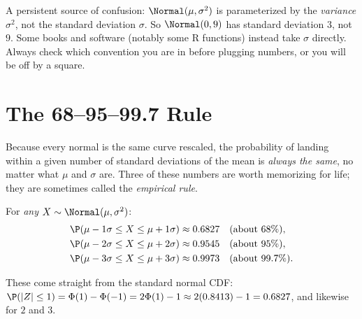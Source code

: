 \begin{trapbox}
A persistent source of confusion: $\Normal(\mu,\sigma^2)$ is parameterized by the
\emph{variance} $\sigma^2$, not the standard deviation $\sigma$. So $\Normal(0,9)$
has standard deviation $3$, not $9$. Some books and software (notably some R
functions) instead take $\sigma$ directly. Always check which convention you are
in before plugging numbers, or you will be off by a square.
\end{trapbox}

\section{The 68--95--99.7 Rule}
\label{ch12:empirical}

Because every normal is the same curve rescaled, the probability of landing within
a given number of standard deviations of the mean is \emph{always the same}, no
matter what $\mu$ and $\sigma$ are. Three of these numbers are worth memorizing
for life; they are sometimes called the \emph{empirical rule}.

\begin{focusbox}
For \emph{any} $X \sim \Normal(\mu, \sigma^2)$:
\begin{align*}
  \P(\mu - 1\sigma \le X \le \mu + 1\sigma) &\approx 0.6827 \quad (\text{about } 68\%),\\
  \P(\mu - 2\sigma \le X \le \mu + 2\sigma) &\approx 0.9545 \quad (\text{about } 95\%),\\
  \P(\mu - 3\sigma \le X \le \mu + 3\sigma) &\approx 0.9973 \quad (\text{about } 99.7\%).
\end{align*}
\end{focusbox}

These come straight from the standard normal CDF:
$\P(|Z| \le 1) = \Phi(1) - \Phi(-1) = 2\Phi(1) - 1 \approx 2(0.8413) - 1 = 0.6827$,
and likewise for $2$ and $3$.

